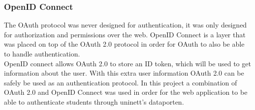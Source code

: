 \subsubsection{OpenID Connect}
The OAuth protocol was never designed for authentication, it was only designed for authorization and permissions over the web. OpenID Connect is a layer that was placed on top of the OAuth 2.0 protocol in order for OAuth to also be able to handle authentication. \\OpenID connect allows OAuth 2.0 to store an ID token, which  will be used to get information about the user. With this extra user information OAuth 2.0 can be safely be used as an authentication protocol. In this project a combination of OAuth 2.0 and OpenID Connect was used in order for the web application to be able to authenticate students through uninett's dataporten. %